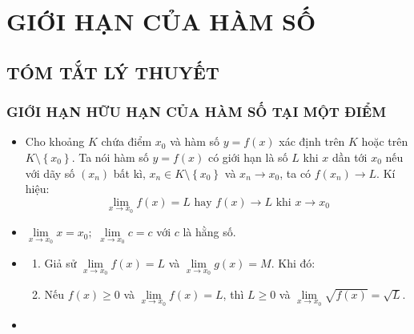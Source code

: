 \section{GIỚI HẠN CỦA HÀM SỐ}
\subsection{TÓM TẮT LÝ THUYẾT}
\subsubsection{GIỚI HẠN HỮU HẠN CỦA HÀM SỐ TẠI MỘT ĐIỂM}
\begin{itemize}
	\item [\iconMT]  Cho khoảng $K$ chứa điểm $x_0$ và hàm số $y=f(x)$ xác định trên $K$ hoặc trên $K\setminus \left\{{x_0}\right\} $. Ta nói hàm số $y=f(x)$ có giới hạn là số $L$ khi $x$ dần tới $x_0$ nếu với dãy số $\left({x_n}\right)$ bất kì, $x_n\in K\setminus \left\{{x_0}\right\}$ và $x_n\to x_0$, ta có $f\left({x_n}\right)\to L $. Kí hiệu:
	$$\lim\limits_{x\to x_0}f(x)=L \text{ hay } f(x)\to L \text{ khi } x\to x_0 $$
	\item [\iconMT]  $\lim\limits_{x\to x_0}x=x_0;$ $\lim\limits_{x\to x_0}c=c$ với $c$ là hằng số.
	\item [\iconMT] 
	\begin{gachsoc}
		\begin{enumerate}
			\item Giả sử $\lim\limits_{x\to x_0}f(x)=L$ và $\lim\limits_{x\to x_0}g(x)=M$. Khi đó:
			\item Nếu $f(x)\geqslant 0$ và $\lim\limits_{x\to x_0}f(x)=L$, thì $L\geqslant 0$ và $\lim\limits_{x\to x_0}\sqrt{{f(x)}}=\sqrt{L} $.
		\end{enumerate}
	\end{gachsoc}
\item [\iconMT] 

\end{itemize}
